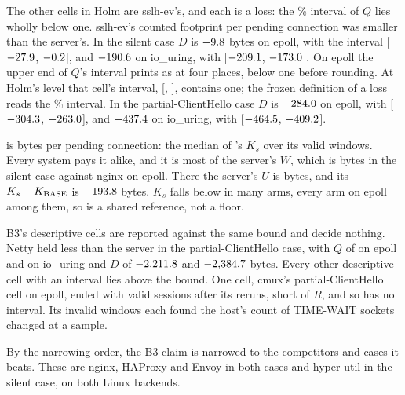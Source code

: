 The \CountLossBThree{} other cells in Holm are sslh-ev's, and each is a loss: the \CiPct\% interval
of $Q$ lies wholly below one. sslh-ev's counted footprint per pending connection was smaller than
the server's. In
the silent case $D$ is $-9.8$ bytes on epoll, with the interval
[$-27.9$, $-0.2$], and
$-190.6$ on io\_uring, with
[$-209.1$, $-173.0$]. On epoll the upper end of
$Q$'s interval prints as \BThreeSilentSslhEvEpollHigh{} at four places, below one before rounding.
At Holm's level that cell's interval, [\BThreeSilentSslhEvEpollHolmLow, \BThreeSilentSslhEvEpollHolmHigh],
contains one; the frozen definition of a loss reads the \CiPct\% interval.
In the partial-ClientHello case $D$ is $-284.0$ on epoll, with
[$-304.3$, $-263.0$], and
$-437.4$ on io\_uring, with
[$-464.5$, $-409.2$].

\Kbase{} is \KBase{} bytes per pending connection: the median of \ophold's $K_s$ over its valid
windows. Every system pays it alike, and it is most of the server's $W$, which is
\BThreeSilentNginxEpollServerW{} bytes in the silent case against nginx on epoll. There the server's
$U$ is \BThreeSilentNginxEpollServerU{} bytes, and its $K_s - K_{\mathrm{BASE}}$ is
$-193.8$ bytes. $K_s$ falls below \Kbase{} in many arms,
every arm on epoll among them, so \Kbase{} is a shared reference, not a floor.

B3's \CountDescBThree{} descriptive cells are reported against the same bound and decide nothing.
Netty held less than the server in the partial-ClientHello case, with $Q$ of
\BThreePartialHelloNettyEpollMedian{} on epoll and \BThreePartialHelloNettyIouringMedian{} on
io\_uring and $D$ of $-2{,}211.8$ and $-2{,}384.7$
bytes. Every other descriptive cell with an interval lies above the bound. One cell,
cmux's partial-ClientHello cell on epoll, ended with \BThreePartialHelloCmuxEpollValid{} valid
sessions after its reruns, short of $R$, and so has no interval. Its
\BThreePartialHelloCmuxEpollInvalidWindows{} invalid windows each found the host's count of
TIME-WAIT sockets changed at a sample.

By the narrowing order, the B3 claim is narrowed to the competitors and cases it beats. These are
nginx, HAProxy and Envoy in both cases and hyper-util in the silent case, on both Linux backends.

